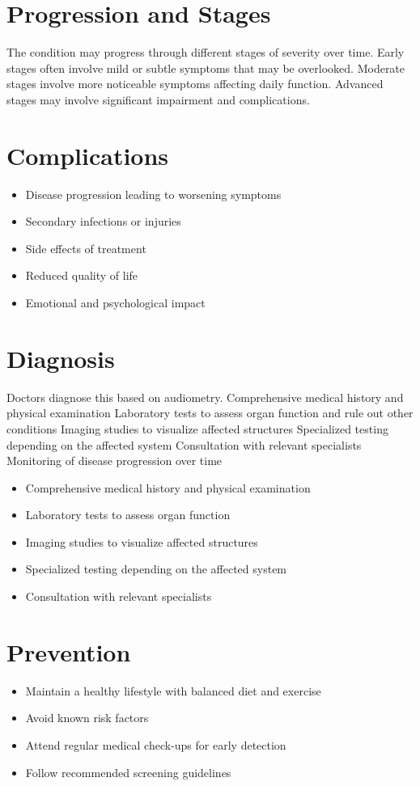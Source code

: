 \section{Progression and Stages}
The condition may progress through different stages of severity over time. Early stages often involve mild or subtle symptoms that may be overlooked. Moderate stages involve more noticeable symptoms affecting daily function. Advanced stages may involve significant impairment and complications.
\section{Complications}
\begin{itemize}[noitemsep]
  \item Disease progression leading to worsening symptoms
  \item Secondary infections or injuries
  \item Side effects of treatment
  \item Reduced quality of life
  \item Emotional and psychological impact
\end{itemize}
\section{Diagnosis}
Doctors diagnose this based on audiometry. Comprehensive medical history and physical examination Laboratory tests to assess organ function and rule out other conditions Imaging studies to visualize affected structures Specialized testing depending on the affected system Consultation with relevant specialists Monitoring of disease progression over time

\begin{itemize}[noitemsep]
  \item Comprehensive medical history and physical examination
  \item Laboratory tests to assess organ function
  \item Imaging studies to visualize affected structures
  \item Specialized testing depending on the affected system
  \item Consultation with relevant specialists
\end{itemize}
\section{Prevention}
\begin{itemize}[noitemsep]
  \item Maintain a healthy lifestyle with balanced diet and exercise
  \item Avoid known risk factors
  \item Attend regular medical check-ups for early detection
  \item Follow recommended screening guidelines
\end{itemize}

